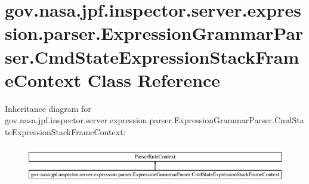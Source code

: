 \hypertarget{classgov_1_1nasa_1_1jpf_1_1inspector_1_1server_1_1expression_1_1parser_1_1_expression_grammar_pa1661807291671005dea18d81e1943036}{}\section{gov.\+nasa.\+jpf.\+inspector.\+server.\+expression.\+parser.\+Expression\+Grammar\+Parser.\+Cmd\+State\+Expression\+Stack\+Frame\+Context Class Reference}
\label{classgov_1_1nasa_1_1jpf_1_1inspector_1_1server_1_1expression_1_1parser_1_1_expression_grammar_pa1661807291671005dea18d81e1943036}
Inheritance diagram for gov.\+nasa.\+jpf.\+inspector.\+server.\+expression.\+parser.\+Expression\+Grammar\+Parser.\+Cmd\+State\+Expression\+Stack\+Frame\+Context\+:\begin{figure}[H]
\begin{center}
\leavevmode
\includegraphics[height=1.656805cm]{classgov_1_1nasa_1_1jpf_1_1inspector_1_1server_1_1expression_1_1parser_1_1_expression_grammar_pa1661807291671005dea18d81e1943036}
\end{center}
\end{figure}
